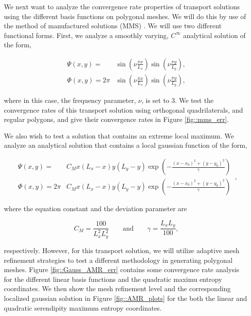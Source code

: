 \documentclass[11pt]{article}
\begin{document}
We next want to analyze the convergence rate properties of transport solutions using the different basis functions on polygonal meshes. We will do this by use of the method of manufactured solutions (MMS) \cite{salari2000code}. We will use two different functional forms. First, we analyze a smoothly varying, $C^{\infty}$ analytical solution of the form,

\begin{equation}
\label{eq::sin_eq}
\begin{aligned}
	\Psi(x,y) = &\sin (\nu \frac{\pi x}{L_x}) \sin (\nu \frac{\pi y}{L_y}), \\
	\Phi(x,y) = 2 \pi &\sin (\nu \frac{\pi x}{L_x}) \sin (\nu \frac{\pi y}{L_y}),
\end{aligned}
\end{equation}

\noindent where in this case, the frequency parameter, $\nu$, is set to 3. We test the convergence rates of this transport solution using orthogonal quadrilaterals, and regular polygons, and give their convergence rates in Figure \ref{fig::mms_err}.

We also wish to test a solution that contains an extreme local maximum. We analyze an analytical solution that contains a local gaussian function of the form,

\begin{equation}
\label{eq::gauss_eq}
\begin{aligned}
	\Psi (x,y) = & C_M x (L_x - x) y (L_y - y) \exp(-\frac{(x-x_0)^2 + (y-y_0)^2}{\gamma}) \\ 
	\Phi (x,y) = 2 \pi & C_M x (L_x - x) y (L_y - y) \exp(-\frac{(x-x_0)^2 + (y-y_0)^2}{\gamma})
\end{aligned} \, ,
\end{equation}

\noindent where the equation constant and the deviation parameter are

\begin{equation}
\label{eq::gaussconsts}
C_M = \frac{100}{L_x^2 L_y^2} \qquad \text{and} \qquad \gamma = \frac{L_x L_y}{100} ,
\end{equation}

\noindent respectively. However, for this transport solution, we will utilize adaptive mesh refinement strategies to test a different methodology in generating polygonal meshes. Figure \ref{fig::Gauss_AMR_err} contains some convergence rate analysis for the different linear basis functions and the quadratic maximu entropy coordinates. We then show the mesh refinement level and the corresponding localized gaussian solution in Figure \ref{fig::AMR_plots} for the both the linear and quadratic serendipity maximum entropy coordinates.
\end{document}
